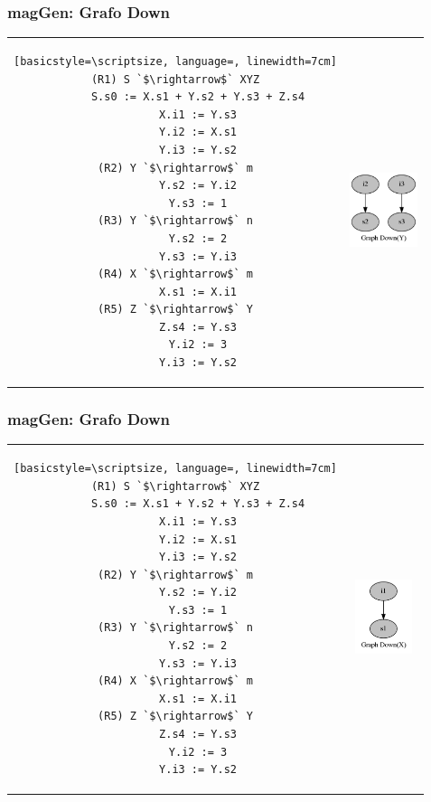 \documentclass[10pt, xcolor=table, xcolor=dvipsnames]{beamer}
\newcommand{\maggen}{\textbf{magGen}}
\begin{document}
\begin{frame}[fragile]
    \frametitle{\maggen: Grafo Down}

\begin{tabular}{c c}
\begin{lstlisting}[basicstyle=\scriptsize, language=, linewidth=7cm]
(R1) S `$\rightarrow$` XYZ
       S.s0 := X.s1 + Y.s2 + Y.s3 + Z.s4
       X.i1 := Y.s3
       Y.i2 := X.s1
       Y.i3 := Y.s2
(R2) Y `$\rightarrow$` m
       Y.s2 := Y.i2
       Y.s3 := 1
(R3) Y `$\rightarrow$` n
       Y.s2 := 2
       Y.s3 := Y.i3
(R4) X `$\rightarrow$` m
       X.s1 := X.i1
(R5) Z `$\rightarrow$` Y
       Z.s4 := Y.s3
       Y.i2 := 3
       Y.i3 := Y.s2
\end{lstlisting}
& \hspace{1cm}\parbox[c]{1em}{\includegraphics[width=75px, height=82px]{./8_down_graph.png}}\\
\end{tabular}

\end{frame}

\begin{frame}[fragile]
    \frametitle{\maggen: Grafo Down}

\begin{tabular}{c c}
\begin{lstlisting}[basicstyle=\scriptsize, language=, linewidth=7cm]
(R1) S `$\rightarrow$` XYZ
       S.s0 := X.s1 + Y.s2 + Y.s3 + Z.s4
       X.i1 := Y.s3
       Y.i2 := X.s1
       Y.i3 := Y.s2
(R2) Y `$\rightarrow$` m
       Y.s2 := Y.i2
       Y.s3 := 1
(R3) Y `$\rightarrow$` n
       Y.s2 := 2
       Y.s3 := Y.i3
(R4) X `$\rightarrow$` m
       X.s1 := X.i1
(R5) Z `$\rightarrow$` Y
       Z.s4 := Y.s3
       Y.i2 := 3
       Y.i3 := Y.s2
\end{lstlisting}
& \hspace{1cm}\parbox[c]{1em}{\includegraphics[width=75px, height=82px]{./7_down_graph.png}}\\
\end{tabular}

\end{frame}
\end{document}

